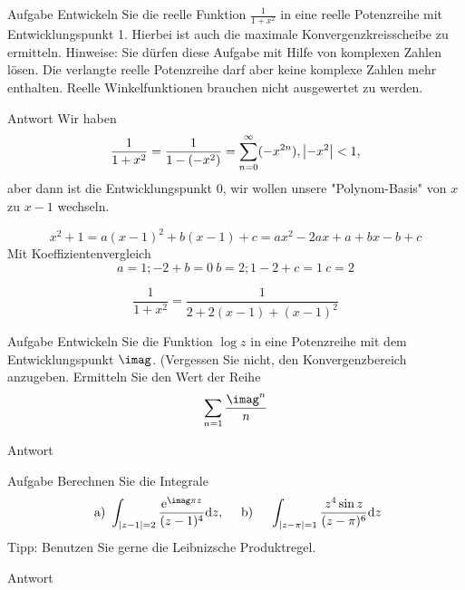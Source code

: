 \documentclass{scrartcl}
\begin{document}
\maketitle
\begin{section}{Aufgabe}%
    Entwickeln Sie die reelle Funktion \( \frac{1}{1+x^{2}} \) in eine reelle Potenzreihe mit Entwicklungspunkt 1. Hierbei ist auch die maximale Konvergenzkreisscheibe zu ermitteln. Hinweise: Sie dürfen diese Aufgabe mit Hilfe von komplexen Zahlen lösen. Die verlangte reelle Potenzreihe darf aber keine komplexe Zahlen mehr enthalten. Reelle Winkelfunktionen brauchen nicht ausgewertet zu werden.
 
\begin{subsection}{Antwort}
Wir haben
\[\frac{1}{1+x^2}=\frac{1}{1-(-x^2)}=\sum_{n=0}^\infty (-x^{2n}), \abs{-x^2}<1,\] aber dann ist die Entwicklungspunkt 0, wir wollen unsere "Polynom-Basis" von $x$ zu $x-1$ wechseln.

\[x^2+1=a (x-1)^2+b(x-1)+c = a x^2-2ax+a+bx-b+c\]
Mit Koeffizientenvergleich
\[a=1;-2+b=0\>b=2;1-2+c=1\>c=2\]

\[\frac{1}{1+x^2}=\frac{1}{2+2(x-1)+(x-1)^2}\]
\end{subsection}
\end{section}
\begin{section}{Aufgabe}%
    Entwickeln Sie die Funktion \( \log z \) in eine Potenzreihe mit dem Entwicklungspunkt $\imag$. (Vergessen Sie nicht, den Konvergenzbereich anzugeben. Ermitteln Sie den Wert der Reihe \[ \sum_{n=1} \frac{\imag^{n}}{n} \] 
    \begin{subsection}{Antwort}
 
    \end{subsection}
\end{section}
\begin{section}{Aufgabe}
    Berechnen Sie die Integrale \[ \text { a) } \int_{|z-1|=2} \frac{\mathrm{e}^{\imag \pi z}}{(z-1)^{4}} \dd z, \quad \text { b) } \quad \int_{|z-\pi|=1} \frac{z^{4} \sin z}{(z-\pi)^{6}} \dd z \] Tipp: Benutzen Sie gerne die Leibnizsche Produktregel.
      \begin{subsection}{Antwort}

    \end{subsection}  
\end{section}
\end{document}
